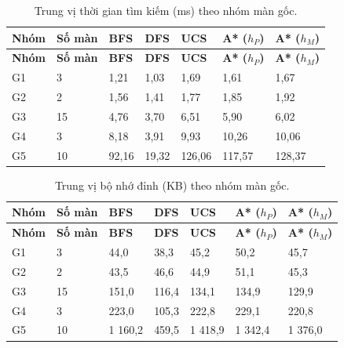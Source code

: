 \begin{longtable}[]{@{}lllllll@{}}
\caption{ Trung vị thời gian tìm kiếm (ms) theo nhóm màn gốc.}\tabularnewline
\toprule\noalign{}
\rowcolor{tablehead}\textbf{Nhóm} & \textbf{Số màn} & \textbf{BFS} & \textbf{DFS} & \textbf{UCS} & \textbf{A* (\(h_P\))} & \textbf{A* (\(h_M\))} \\
\midrule\noalign{}
\endfirsthead
\toprule\noalign{}
\rowcolor{tablehead}\textbf{Nhóm} & \textbf{Số màn} & \textbf{BFS} & \textbf{DFS} & \textbf{UCS} & \textbf{A* (\(h_P\))} & \textbf{A* (\(h_M\))} \\
\midrule\noalign{}
\endhead
\bottomrule\noalign{}
\endlastfoot
G1 & 3 & 1,21 & 1,03 & 1,69 & 1,61 & 1,67 \\
G2 & 2 & 1,56 & 1,41 & 1,77 & 1,85 & 1,92 \\
G3 & 15 & 4,76 & 3,70 & 6,51 & 5,90 & 6,02 \\
G4 & 3 & 8,18 & 3,91 & 9,93 & 10,26 & 10,06 \\
G5 & 10 & 92,16 & 19,32 & 126,06 & 117,57 & 128,37 \\
\end{longtable}

\begin{longtable}[]{@{}lllllll@{}}
\caption{ Trung vị bộ nhớ đỉnh (KB) theo nhóm màn gốc.}\tabularnewline
\toprule\noalign{}
\rowcolor{tablehead}\textbf{Nhóm} & \textbf{Số màn} & \textbf{BFS} & \textbf{DFS} & \textbf{UCS} & \textbf{A* (\(h_P\))} & \textbf{A* (\(h_M\))} \\
\midrule\noalign{}
\endfirsthead
\toprule\noalign{}
\rowcolor{tablehead}\textbf{Nhóm} & \textbf{Số màn} & \textbf{BFS} & \textbf{DFS} & \textbf{UCS} & \textbf{A* (\(h_P\))} & \textbf{A* (\(h_M\))} \\
\midrule\noalign{}
\endhead
\bottomrule\noalign{}
\endlastfoot
G1 & 3 & 44,0 & 38,3 & 45,2 & 50,2 & 45,7 \\
G2 & 2 & 43,5 & 46,6 & 44,9 & 51,1 & 45,3 \\
G3 & 15 & 151,0 & 116,4 & 134,1 & 134,9 & 129,9 \\
G4 & 3 & 223,0 & 105,3 & 222,8 & 229,1 & 220,8 \\
G5 & 10 & 1 160,2 & 459,5 & 1 418,9 & 1 342,4 & 1 376,0 \\
\end{longtable}

